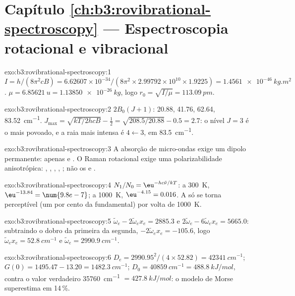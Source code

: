 \section*{Capítulo \ref{ch:b3:rovibrational-spectroscopy} --- Espectroscopia rotacional e vibracional}

\begin{solution}{exo:b3:rovibrational-spectroscopy:1}
$I = h/(8\pi^2cB) = 6.62607 \times 10^{-34}/(8\pi^2 \times 2.99792 \times 10^{10} \times
1.9225) = \qty{1.4561e-46}{kg.m^2}$. $\mu = \qty{6.85621}{u} = \qty{1.13850e-26}{kg}$, logo
$r_0 = \sqrt{I/\mu} = \qty{113.09}{pm}$.
\end{solution}

\begin{solution}{exo:b3:rovibrational-spectroscopy:2}
$2B_0(J+1)$: 20.88, 41.76, 62.64, \qty{83.52}{cm^{-1}}. $J_{\max} = \sqrt{kT/2hcB} -
\frac12 = \sqrt{208.5/20.88} - 0.5 = 2.7$: o nível $J = 3$ é o mais
povoado, e a raia mais intensa é $4 \leftarrow 3$, em \qty{83.5}{cm^{-1}}.
\end{solution}

\begin{solution}{exo:b3:rovibrational-spectroscopy:3}
A absorção de micro-ondas exige um dipolo permanente: apenas  e .
O Raman rotacional exige uma polarizabilidade anisotrópica: , , ,
, ; não os   e .
\end{solution}

\begin{solution}{exo:b3:rovibrational-spectroscopy:4}
$N_1/N_0 = \eu^{-hc\tilde\nu/kT}$: a \qty{300}{K}, $\eu^{-13.84} = \num{9.8e-7}$; a
\qty{1000}{K}, $\eu^{-4.15} = 0.016$. A  só se torna perceptível (um por cento
da fundamental) por volta de \qty{1000}{K}.
\end{solution}

\begin{solution}{exo:b3:rovibrational-spectroscopy:5}
$\tilde\omega_e - 2\tilde\omega_ex_e = 2885.3$ e $2\tilde\omega_e - 6\tilde\omega_ex_e =
5665.0$: subtraindo o dobro da primeira da segunda, $-2\tilde\omega_ex_e = -105.6$,
logo $\tilde\omega_ex_e = \qty{52.8}{cm^{-1}}$ e $\tilde\omega_e = \qty{2990.9}{cm^{-1}}$.
\end{solution}

\begin{solution}{exo:b3:rovibrational-spectroscopy:6}
$D_e = 2990.95^2/(4 \times 52.82) = \qty{42341}{cm^{-1}}$; $G(0) = 1495.47 - 13.20 =
\qty{1482.3}{cm^{-1}}$; $D_0 = \qty{40859}{cm^{-1}} = \qty{488.8}{kJ/mol}$, contra o valor verdadeiro
\qty{35760}{cm^{-1}} $= \qty{427.8}{kJ/mol}$: o modelo de Morse superestima em 14\,\%.
\end{solution}

